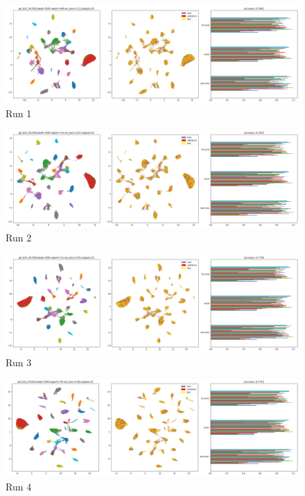 \documentclass{article}
\begin{document}
\begin{figure}[h!]
  \includegraphics[width=\linewidth]{new_journal/figures/experiments/roznet_attn/medium/lr0.001/run1.png}
  \caption{Run 1}
\end{figure}

\begin{figure}[h!]
  \includegraphics[width=\linewidth]{new_journal/figures/experiments/roznet_attn/medium/lr0.001/run2.png}
  \caption{Run 2}
\end{figure}

\begin{figure}[h!]
  \includegraphics[width=\linewidth]{new_journal/figures/experiments/roznet_attn/medium/lr0.001/run3.png}
  \caption{Run 3}
\end{figure}

\begin{figure}[h!]
  \includegraphics[width=\linewidth]{new_journal/figures/experiments/roznet_attn/medium/lr0.001/run4.png}
  \caption{Run 4}
\end{figure}
\end{document}
